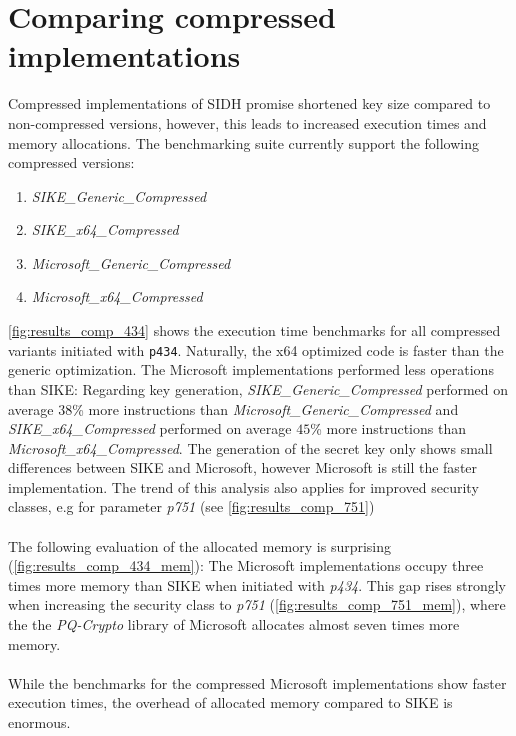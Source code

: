 \section{Comparing compressed implementations}
Compressed implementations of SIDH promise shortened key size compared to non-compressed versions, however, this leads to increased execution times and memory allocations. The benchmarking suite currently support the following compressed versions:
\begin{enumerate}
\item \textit{SIKE\_Generic\_Compressed}
\item \textit{SIKE\_x64\_Compressed}
\item \textit{Microsoft\_Generic\_Compressed}
\item \textit{Microsoft\_x64\_Compressed}
\end{enumerate}
\autoref{fig:results_comp_434} shows the execution time benchmarks for all compressed variants initiated with \texttt{p434}. Naturally, the x64 optimized code is faster than the generic optimization. The Microsoft implementations performed less operations than SIKE: Regarding key generation, \textit{SIKE\_Generic\_Compressed} performed on average $38$\% more instructions than \textit{Microsoft\_Generic\_Compressed} and \textit{SIKE\_x64\_Compressed} performed on average $45$\% more instructions than \textit{Microsoft\_x64\_Compressed}. The generation of the secret key only shows small differences between SIKE and Microsoft, however Microsoft is still the faster implementation. The trend of this analysis also applies for improved security classes, e.g for parameter \textit{p751} (see \autoref{fig:results_comp_751})
\\\\
The following evaluation of the allocated memory is surprising (\autoref{fig:results_comp_434_mem}): The Microsoft implementations occupy three times more memory than SIKE when initiated with \textit{p434}. This gap rises strongly when increasing the security class to \textit{p751} (\autoref{fig:results_comp_751_mem}), where the the \textit{PQ-Crypto} library of Microsoft allocates almost seven times more memory.
\\\\
While the benchmarks for the compressed Microsoft implementations show faster execution times, the overhead of allocated memory compared to SIKE is enormous.
